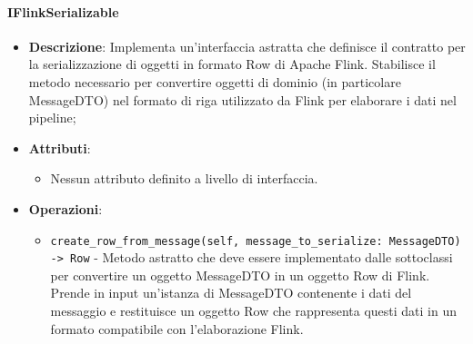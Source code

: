 \documentclass[10pt]{article}
\begin{document}
    \paragraph{IFlinkSerializable}
    \begin{itemize} 
    \item \textbf{Descrizione}: Implementa un'interfaccia astratta che definisce il contratto per la serializzazione di oggetti in formato Row di Apache Flink. Stabilisce il metodo necessario per convertire oggetti di dominio (in particolare MessageDTO) nel formato di riga utilizzato da Flink per elaborare i dati nel pipeline;
    \item \textbf{Attributi}:
    \begin{itemize}
        \item Nessun attributo definito a livello di interfaccia.
    \end{itemize}
    
    \item \textbf{Operazioni}:
    \begin{itemize}
        \item \texttt{create\_row\_from\_message(self, message\_to\_serialize: MessageDTO) -> Row} - Metodo astratto che deve essere implementato dalle sottoclassi per convertire un oggetto MessageDTO in un oggetto Row di Flink. Prende in input un'istanza di MessageDTO contenente i dati del messaggio e restituisce un oggetto Row che rappresenta questi dati in un formato compatibile con l'elaborazione Flink.
    \end{itemize}
    \end{itemize}
\end{document}
